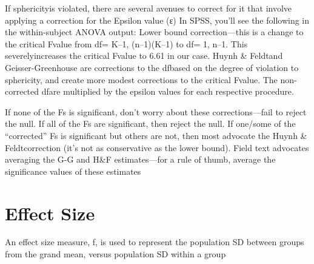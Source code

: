 \documentclass[]{book}
\theoremstyle{definition}
\theoremstyle{definition}
\theoremstyle{definition}
\theoremstyle{remark}
\begin{document}
If sphericityis violated, there are several avenues to correct for it
that involve applying a correction for the Epsilon value (ε) In SPSS,
you'll see the following in the within-subject ANOVA output: Lower bound
correction---this is a change to the critical Fvalue from df= K--1,
(n--1)(K--1) to df= 1, n--1. This severelyincreases the critical Fvalue
to 6.61 in our case. Huynh \& Feldtand Geisser-Greenhouse are
corrections to the dfbased on the degree of violation to sphericity, and
create more modest corrections to the critical Fvalue. The non-corrected
dfare multiplied by the epsilon values for each respective procedure.

If none of the Fs is significant, don't worry about these
corrections---fail to reject the null. If all of the Fs are significant,
then reject the null. If one/some of the ``corrected'' Fs is significant
but others are not, then most advocate the Huynh \& Feldtcorrection
(it's not as conservative as the lower bound). Field text advocates
averaging the G-G and H\&F estimates---for a rule of thumb, average the
significance values of these estimates

\section{Effect Size}\label{effect-size}

An effect size measure, f, is used to represent the population SD
between groups from the grand mean, versus population SD within a group
\end{document}
